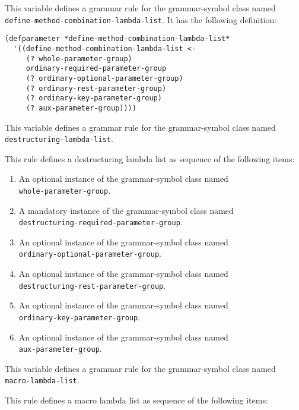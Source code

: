 
This variable defines a grammar rule for the grammar-symbol class
named \texttt{define-method-combination-lambda-list}.  It has the
following definition:

\begin{verbatim}
(defparameter *define-method-combination-lambda-list*
  '((define-method-combination-lambda-list <-
     (? whole-parameter-group)
     ordinary-required-parameter-group
     (? ordinary-optional-parameter-group)
     (? ordinary-rest-parameter-group)
     (? ordinary-key-parameter-group)
     (? aux-parameter-group))))
\end{verbatim}


This variable defines a grammar rule for the grammar-symbol class
named \texttt{destructuring-lambda-list}.

This rule defines a destructuring lambda list as sequence of the
following items:

\begin{enumerate}
\item An optional instance of the grammar-symbol class named\\
  \texttt{whole-parameter-group}.
\item A mandatory instance of the grammar-symbol class named\\
  \texttt{destructuring-required-parameter-group}.
\item An optional instance of the grammar-symbol class named\\
  \texttt{ordinary-optional-parameter-group}.
\item An optional instance of the grammar-symbol class named\\
\texttt{destructuring-rest-parameter-group}.
\item An optional instance of the grammar-symbol class named\\
\texttt{ordinary-key-parameter-group}.
\item An optional instance of the grammar-symbol class named\\
\texttt{aux-parameter-group}.
\end{enumerate}


This variable defines a grammar rule for the grammar-symbol class
named \texttt{macro-lambda-list}.

This rule defines a macro lambda list as sequence of the
following items:

